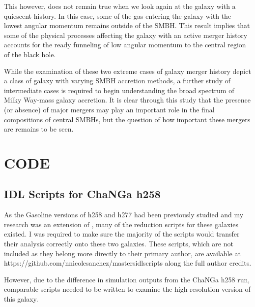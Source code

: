 \documentclass[12pt,headA,chapB]{fiskthesis}
\begin{document}
This however, does not remain true when we look again at the galaxy with a quiescent history. In this case, some of the gas entering the galaxy with the lowest angular momentum remains outside of the SMBH. This result implies that some of the physical processes affecting the galaxy with an active merger history accounts for the ready funneling of low angular momentum to the central region of the black hole. 

While the examination of these two extreme cases of galaxy merger history depict a class of galaxy with varying SMBH accretion methods, a further study of intermediate cases is required to begin understanding the broad spectrum of Milky Way-mass galaxy accretion. It is clear through this study that the presence (or absence) of major mergers may play an important role in the final compositions of central SMBHs, but the question of how important these mergers are remains to be seen.




\chapter{CODE}
\section{IDL Scripts for ChaNGa h258}
As the Gasoline versions of h258 and h277 had been previously studied and my research was an extension of \cite{Bellovary2013}, many of the reduction scripts for these galaxies existed. I was required to make sure the majority of the scripts would transfer their analysis correctly onto these two galaxies. These scripts, which are not included as they belong more directly to their primary author, are available at https://github.com/nnicolesanchez/mastersidlscripts along the full author credits.

However, due to the difference in simulation outputs from the ChaNGa h258 run, comparable scripts needed to be written to examine the high resolution version of this galaxy.
\end{document}

